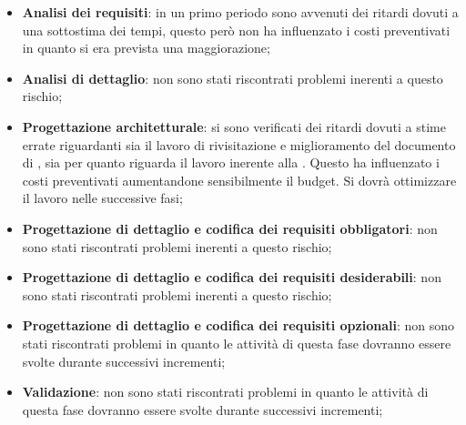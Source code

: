 			\begin{itemize}
				\item \textbf{Analisi dei requisiti}: in un primo periodo sono avvenuti dei ritardi dovuti a una sottostima dei tempi, questo però non ha influenzato i costi preventivati in quanto si era prevista una maggiorazione;
				\item \textbf{Analisi di dettaglio}: non sono stati riscontrati problemi inerenti a questo rischio;
				\item \textbf{Progettazione architetturale}: si sono verificati dei ritardi dovuti a stime errate riguardanti sia il lavoro di rivisitazione e miglioramento del documento di \docNameVersionAdR, sia per quanto riguarda il lavoro inerente alla \docNameVersionST. Questo ha influenzato i costi preventivati aumentandone sensibilmente il budget. Si dovrà ottimizzare il lavoro nelle successive fasi;
				\item \textbf{Progettazione di dettaglio e codifica dei requisiti obbligatori}: non sono stati riscontrati problemi inerenti a questo rischio;
				\item \textbf{Progettazione di dettaglio e codifica dei requisiti desiderabili}: non sono stati riscontrati problemi inerenti a questo rischio;
				\item \textbf{Progettazione di dettaglio e codifica dei requisiti opzionali}: non sono stati riscontrati problemi in quanto le attività di questa fase dovranno essere svolte durante successivi incrementi;
				\item \textbf{Validazione}: non sono stati riscontrati problemi in quanto le attività di questa fase dovranno essere svolte durante successivi incrementi;
			\end{itemize}



